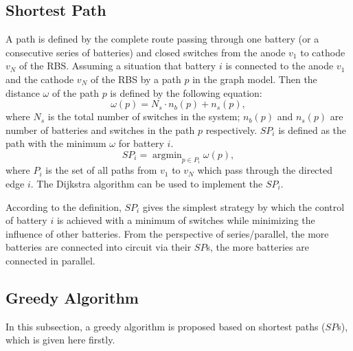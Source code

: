 \documentclass{article}
\begin{document}
\subsection{Shortest Path}
A path is defined by the complete route passing through one battery (or a consecutive series of batteries) and closed switches from the anode $v_1$ to cathode $v_N$ of the RBS.
Assuming a situation that battery $i$ is connected to the anode $v_1$ and the cathode $v_N$ of the RBS by a path $p$ in the graph model.
Then the distance $\omega$ of the path $p$ is defined by the following equation: %
\begin{equation}\label{eq:weight}
    \omega(p) = N_s \cdot n_b (p) + n_s (p),
\end{equation}
where $N_s$ is the total number of switches in the system; $n_b(p)$ and $n_s(p)$ are number of batteries and switches in the path $p$ respectively. 
$SP_i$ is defined as the path with the minimum $\omega$ for battery $i$.
\begin{equation}\label{eq:def_sp}
    SP_i = \mathop{\arg\min}_{p \in P_i} \omega(p),
\end{equation}
where $P_i$ is the set of all paths from $v_1$ to $v_N$ which pass through the directed edge $i$.
The Dijkstra algorithm can be used to implement the $SP_i$. %


According to the definition, $SP_i$ gives the simplest strategy by which the control of battery $i$ is achieved with a minimum of switches while minimizing the influence of other batteries.
From the perspective of series/parallel, the more batteries are connected into circuit via their $SP$s, the more batteries are connected in parallel.

\subsection{Greedy Algorithm}\label{subsec:greedy_solution}

In this subsection, a greedy algorithm is proposed based on shortest paths ($SP$s), which is given here firstly. %
\end{document}
